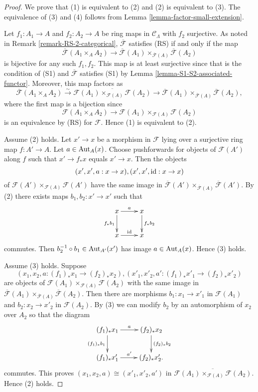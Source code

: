 \begin{proof}
We prove that (1) is equivalent to (2) and (2) is equivalent to (3).  The 
equivalence of (3) and (4) follows from Lemma 
\ref{lemma-factor-small-extension}.  

\medskip \noindent
Let $f_1: A_1 \rightarrow A$ and $f_2: A_2 \rightarrow A$ be ring maps in 
$\mathcal C_{\Lambda}$ with $f_2$ surjective.  As noted in Remark 
\ref{remark-RS-2-categorical}, $\overline{\mathcal F}$ satisfies (RS) if and 
only if the map
\[ 
\overline{\mathcal F}(A_1 \times_{A} A_2) \rightarrow \overline{\mathcal 
F}(A_1) \times_{\overline{\mathcal F}(A)} \overline{\mathcal F}(A_2)
\]
is bijective for any such $f_1,f_2$. This map is at least surjective since that 
is the condition of (S1) and $\overline{\mathcal F}$ satisfies (S1) by Lemma 
\ref{lemma-S1-S2-associated-functor}.  Moreover, this map factors as
\[ 
\overline{\mathcal F}(A_1 \times_{A} A_2) 
\xrightarrow{\sim} \overline{\mathcal F(A_1) \times_{\mathcal F(A)} \mathcal 
F(A_2)}
\rightarrow \overline{\mathcal F}(A_1) \times_{\overline{\mathcal F}(A)} 
\overline{\mathcal F}(A_2),
\]
where the first map is a bijection since 
\[
\mathcal F(A_1 \times_{A} A_2) \rightarrow \mathcal F(A_1) \times_{\mathcal 
F(A)} \mathcal F(A_2)
\]
is an equivalence by (RS) for $\mathcal F$.  Hence (1) is equivalent to (2).

\medskip \noindent
Assume (2) holds.  Let $x' \rightarrow x$  be a morphism in $\mathcal F$ lying 
over a surjective ring map $f: A' \rightarrow A$.  Let $a \in 
\textnormal{Aut}_{A}(x)$.  Choose pushforwards for objects of $\mathcal F(A')$ 
along $f$ such that $x' \rightarrow f_* x$ equals $x' \rightarrow x$. Then the 
objects
\[ (x',x', a: x \rightarrow x), (x',x', \textnormal{id}: x \rightarrow x) \]
of $\mathcal F(A') \times_{\mathcal F(A)} \mathcal F(A')$ have the same image 
in $\overline{\mathcal F}(A') \times_{\overline{\mathcal F}(A)} 
\overline{\mathcal F}(A')$.  By (2) there exists maps $b_1,b_2: x' \rightarrow 
x'$ such that
\[ 
\xymatrix{
x \ar[r]^{a} \ar[d]_{f_*b_1} & x \ar[d]^{f_*b_2} \\
x \ar[r]^{\textnormal{id}} & x
}
\]
commutes.  Then $b_2^{-1} \circ b_1 \in \textnormal{Aut}_{A'}(x')$ has image $a 
\in \textnormal{Aut}_{A}(x)$.  Hence (3) holds.

\medskip \noindent
Assume (3) holds. Suppose
\[ (x_1,x_2, a: (f_1)_*x_1 \rightarrow (f_2)_*x_2), (x'_1,x'_2, a': (f_1)_*x'_1 
\rightarrow (f_2)_*x'_2) \]
are objects of $\mathcal F(A_1) \times_{\mathcal F(A)} \mathcal F(A_2)$ with 
the same image in $\overline{\mathcal F}(A_1) \times_{\overline{\mathcal F}(A)} 
\overline{\mathcal F}(A_2)$. Then there are morphisms $b_1: x_1 \rightarrow 
x'_1$ in $\mathcal F(A_1)$ and $b_2: x_2 \rightarrow x'_2$ in $\mathcal 
F(A_2)$. By (3) we can modify $b_2$ by an automorphism of $x_2$ over $A_2$ so 
that the diagram
\[
\xymatrix{
(f_1)_*x_1 \ar[r]^{a} \ar[d]_{(f_1)_*b_1} & (f_2)_*x_2 \ar[d]^{(f_2)_*b_2} \\
(f_1)_*x'_1 \ar[r]^{a'} & (f_2)_*x'_2.
}
\]
commutes. This proves $(x_1,x_2, a) \cong (x'_1,x'_2,a')$ in 
$\overline{\mathcal F(A_1) \times_{\mathcal F(A)} \mathcal F(A_2)}$.  Hence (2) 
holds.
\end{proof}

